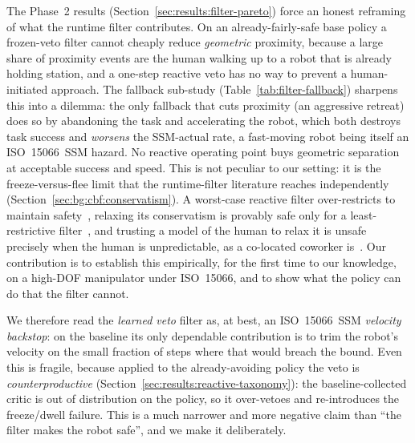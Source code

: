 \documentclass[11pt,a4paper]{report}
\newcommand{\ssm}{SSM}
\newcommand{\iso}{ISO~15066}
\begin{document}
The Phase~2 results (Section~\ref{sec:results:filter-pareto}) force an
honest reframing of what the runtime filter contributes. On an
already-fairly-safe base policy a frozen-veto filter cannot cheaply
reduce \emph{geometric} proximity, because a large share of proximity
events are the human walking up to a robot that is already holding
station, and a one-step reactive veto has no way to prevent a
human-initiated approach. The fallback sub-study
(Table~\ref{tab:filter-fallback}) sharpens this into a dilemma: the
only fallback that cuts proximity (an aggressive retreat) does so by
abandoning the task and accelerating the robot, which both destroys
task success and \emph{worsens} the \ssm{}-actual rate, a fast-moving
robot being itself an \iso{}~\ssm{} hazard. No reactive operating point
buys geometric separation at acceptable success and speed. This is not
peculiar to our setting: it is the freeze-versus-flee limit that the
runtime-filter literature reaches independently
(Section~\ref{sec:bg:cbf:conservatism}). A worst-case reactive filter
over-restricts to maintain safety~\cite{tian2022confidence}, relaxing
its conservatism is provably safe only for a least-restrictive
filter~\cite{permissivefilter2025}, and trusting a model of the human to
relax it is unsafe precisely when the human is unpredictable, as a
co-located coworker is~\cite{tian2022confidence}. Our contribution is to
establish this empirically, for the first time to our knowledge, on a
high-DOF manipulator under \iso{}, and to show what the policy can do
that the filter cannot.

We therefore read the \emph{learned veto} filter as, at best, an
\iso{}~\ssm{} \emph{velocity backstop}: on the baseline its only
dependable contribution is to trim the robot's velocity on the small
fraction of steps where that would breach the bound. Even this is
fragile, because applied to the already-avoiding policy the veto is
\emph{counterproductive} (Section~\ref{sec:results:reactive-taxonomy}):
the baseline-collected critic is out of distribution on the policy, so
it over-vetoes and re-introduces the freeze/dwell failure. This is a
much narrower and more negative claim than ``the filter makes the
robot safe'', and we make it deliberately.
\end{document}
